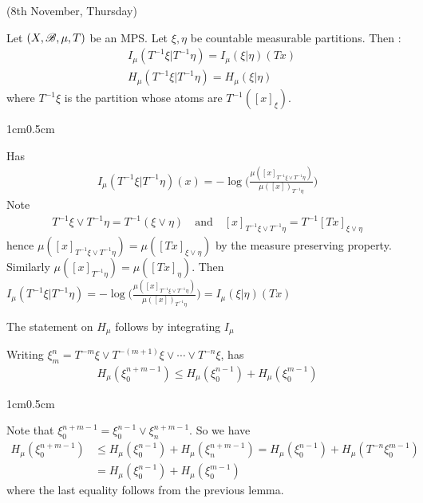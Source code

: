 \documentclass[12pt,a4paper]{report}
\newenvironment{proof}
{\begin{changemargin}{1cm}{0.5cm} 
	}%
	{\end{changemargin}
}
\begin{document}
\newday

(8th November, Thursday)
\s

\lem Let $(X,\mathscr{B}, \mu, T)$ be an MPS. Let $\xi, \eta$ be countable measurable partitions. Then :
\begin{align*}
& I_{\mu}(T^{-1}\xi | T^{-1} \eta ) = I_{\mu}(\xi | \eta)(Tx) \\
& H_{\mu}(T^{-1} \xi | T^{-1} \eta) = H_{\mu}(\xi | \eta)
\end{align*}
where $T^{-1} \xi$ is the partition whose atoms are $T^{-1}([x]_{\xi})$.

\begin{proof}
\pf Has 
\begin{align*}
I_{\mu}(T^{-1} \xi | T^{-1} \eta)(x)  = -\log \Big( \frac{\mu([x]_{T^{-1}\xi \vee T^{-1}\eta} )}{\mu([x])_{T^{-1}\eta}} \Big)
\end{align*}
Note
\begin{align*}
T^{-1} \xi \vee T^{-1}\eta = T^{-1}(\xi \vee \eta) \quad \text{and} \quad [x]_{T^{-1} \xi \vee T^{-1}\eta} = T^{-1} [Tx]_{\xi \vee \eta}
\end{align*}
hence $\mu([x]_{T^{-1} \xi \vee T^{-1}\eta}) = \mu([Tx]_{\xi \vee \eta})$ by the measure preserving property. Similarly $\mu([x]_{T^{-1}\eta}) = \mu ([Tx]_{\eta})$. Then $I_{\mu}(T^{-1}\xi | T^{-1} \eta ) = -\log \Big( \frac{\mu([x]_{T^{-1}\xi \vee T^{-1}\eta} )}{\mu([x])_{T^{-1}\eta}} \Big) =  I_{\mu}(\xi | \eta)(Tx)$

\quad The statement on $H_{\mu}$ follows by integrating $I_{\mu}$

\eop
\end{proof}
\s

\cor Writing $\xi_m^n = T^{-m} \xi \vee T^{-(m+1)}\xi \vee \cdots \vee T^{-n} \xi$, has
\begin{align*}
H_{\mu}(\xi_0^{n+m-1}) \leq H_{\mu}(\xi_0^{n-1}) + H_{\mu}(\xi_0^{m-1})
\end{align*}
\begin{proof}
\pf Note that $\xi_0^{n+m-1} = \xi_0^{n-1} \vee \xi_n^{n+m-1}$. So we have
\begin{align*}
H_{\mu}(\xi_0^{n+m-1}) &\leq H_{\mu}(\xi_0^{n-1})+ H_{\mu}(\xi_n^{n+m-1}) = H_{\mu}(\xi_0^{n-1}) + H_{\mu}(T^{-n}\xi_0^{m-1}) \\
&= H_{\mu}(\xi_0^{n-1}) + H_{\mu}(\xi_0^{m-1})
\end{align*}
where the last equality follows from the previous lemma.

\eop
\end{proof}
\s
\end{document}
